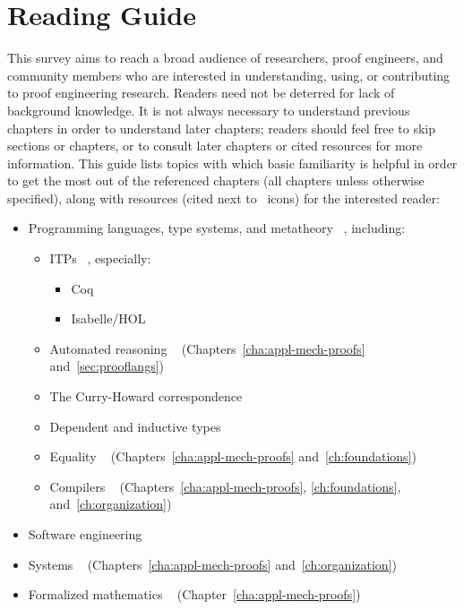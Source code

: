 \section{Reading Guide}

This survey aims to reach a broad audience of researchers, proof engineers, and community members
who are interested in understanding, using, or contributing to proof engineering research.
Readers need not be deterred for lack of background knowledge.
It is not always necessary to understand previous chapters in order to understand later chapters;
readers should feel free to skip sections or chapters, or to consult later chapters or cited resources for more information.
This guide lists topics with which basic familiarity is helpful
in order to get the most out of the referenced chapters (all chapters unless otherwise specified),
along with resources (cited next to \Letter\ icons) for the interested reader:

\begin{itemize}
\item Programming languages, type systems, and metatheory \Letter~\citep{pierce2002types, harper2016practical}, including:
\begin{itemize}
\item ITPs \Letter~\citep{pa-history-geuvers-sadhana09, Harrison2014}, especially:
\begin{itemize}
\item Coq \Letter~\citep{CPDT, Pierce-al:SF, CoqArt} 
\item Isabelle/HOL \Letter~\citep{wenzel2004isabelle, Nipkow2014concrete} 
\end{itemize}
\item Automated reasoning \Letter~\citep{Bradley2007, Kroening2008} (Chapters~\ref{cha:appl-mech-proofs} and~\ref{sec:prooflangs})
\item The Curry-Howard correspondence \Letter~\citep{pfenning2010curry, sorensen2006lectures}
\item Dependent and inductive types \Letter~\citep{CPDT}
\item Equality \Letter~\citep{CPDT, nlab:equality} (Chapters~\ref{cha:appl-mech-proofs} and~\ref{ch:foundations})
\item Compilers \Letter~\citep{cooper2011engineering} (Chapters~\ref{cha:appl-mech-proofs}, \ref{ch:foundations}, and~\ref{ch:organization})
\end{itemize}
\item Software engineering \Letter~\citep{se-canon} %
\item Systems \Letter~\citep{Anderson2014, Cachin2011} (Chapters~\ref{cha:appl-mech-proofs} and~\ref{ch:organization})
\item Formalized mathematics \Letter~\citep{ams-proof, nlab:foundation_of_mathematics} (Chapter~\ref{cha:appl-mech-proofs})
\end{itemize}

